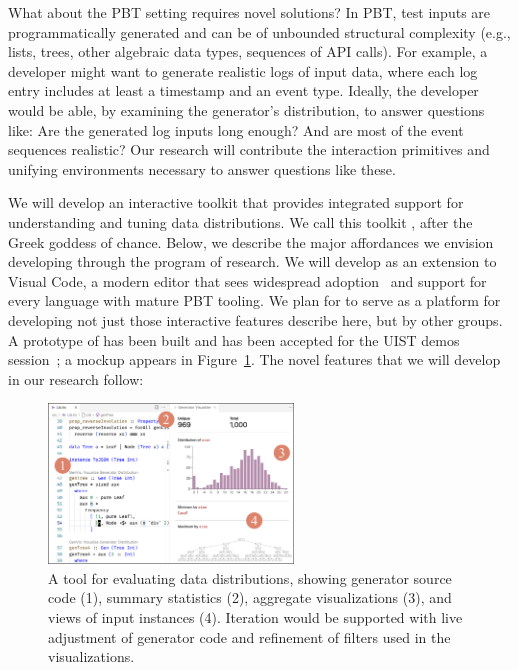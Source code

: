 What about the PBT setting requires novel solutions?
In PBT, test inputs are
programmatically generated and
can be of unbounded structural
complexity (e.g., lists, trees, other algebraic data types,
sequences of API calls).
For example, a developer might want to generate
realistic logs of input data, where each log entry includes at least a timestamp
and an event type.
%
Ideally, the developer would be able, by examining the generator's
distribution, to answer
questions like: Are the generated log inputs long enough? And are most
of the event sequences realistic?
Our research will contribute the interaction primitives and
 unifying environments necessary to answer questions like these.

We will develop an interactive toolkit that provides integrated support for understanding and tuning data distributions. We call this toolkit \tyche{}, after the Greek goddess of chance. Below, we describe the major affordances we envision developing through the program of research. We will develop \tyche{} as an extension to Visual Code, a modern editor that sees widespread adoption~\cite{noauthor_stack_nodate} and support for every language with mature PBT tooling. We plan for \tyche{} to serve as a platform for developing not just those interactive features describe here, but by other groups. A prototype of \tyche{} has been built and has been accepted for the UIST demos session~\cite{ref:goldstein2023tyche}; a mockup appears in Figure~\ref{fig:gen-vis}. The novel features that we will develop in our research follow:

\begin{figure}
  \centering
  \includegraphics[width=0.58\textwidth]{assets/gen-vis.pdf}
  \caption{A tool for evaluating data distributions, showing
  generator source code (1), summary statistics (2),
  aggregate visualizations (3), and views of input instances
  (4). Iteration would be supported with live adjustment of
  generator code and refinement of filters used in the
  visualizations.}\label{fig:gen-vis}
\end{figure}

